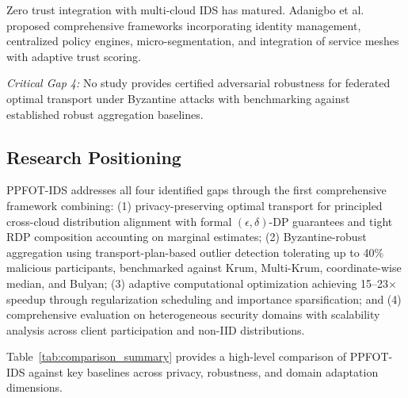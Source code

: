 \documentclass{ieeeaccess}
\theoremstyle{plain}
\theoremstyle{definition}
\theoremstyle{remark}
\begin{document}
Zero trust integration with multi-cloud IDS has matured. Adanigbo et al.~\cite{adanigbo2024} proposed comprehensive frameworks incorporating identity management, centralized policy engines, micro-segmentation, and integration of service meshes with adaptive trust scoring.

\textit{Critical Gap 4:} No study provides certified adversarial robustness for federated optimal transport under Byzantine attacks with benchmarking against established robust aggregation baselines.

\subsection{Research Positioning}

PPFOT-IDS addresses all four identified gaps through the first comprehensive framework combining: (1) privacy-preserving optimal transport for principled cross-cloud distribution alignment with formal $(\epsilon, \delta)$-DP guarantees and tight RDP composition accounting on marginal estimates; (2) Byzantine-robust aggregation using transport-plan-based outlier detection tolerating up to 40\% malicious participants, benchmarked against Krum, Multi-Krum, coordinate-wise median, and Bulyan; (3) adaptive computational optimization achieving 15--23$\times$ speedup through regularization scheduling and importance sparsification; and (4) comprehensive evaluation on heterogeneous security domains with scalability analysis across client participation and non-IID distributions.

Table~\ref{tab:comparison_summary} provides a high-level comparison of PPFOT-IDS against key baselines across privacy, robustness, and domain adaptation dimensions.
\end{document}
